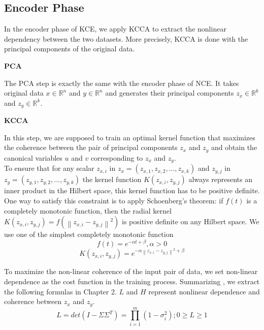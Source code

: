\documentclass[12pt]{report} %
\newcommand{\norm}[1]{\left\lVert #1 \right\rVert}
\begin{document}
\subsection{Encoder Phase}
In the encoder phase of KCE, we apply KCCA to extract the nonlinear dependency between the two datasets. More precisely, KCCA is done with the principal components of the original data.

\textbf{PCA}

The PCA step is exactly the same with the encoder phase of NCE. It takes original data $x\in \mathbb{R}^{n}$ and $y\in \mathbb{R}^{n}$ and generates their principal components $z_x\in \mathbb{R}^{k}$ and $z_y\in \mathbb{R}^{k}$.

\textbf{KCCA}

In this step, we are supposed to train an optimal kernel function that maximizes the coherence between the pair of principal components $z_x$ and $z_y$ and obtain the canonical variables $u$ and $v$ corresponding to $z_x$ and $z_y$. \\
To ensure that for any scalar \(z_{x,i}\) in \(z_x=(z_{x,1},z_{x,2},...,z_{x,k})\) and \(z_{y,j}\) in \(z_y=(z_{y,1},z_{y,2},...,z_{y,k})\) the kernel function $K(z_{x,i},z_{y,j})$ always represents an inner product in the Hilbert space, this kernel function has to be positive definite. One way to satisfy this constraint is to apply Schoenberg's theorem: if \(f(t)\) is a completely monotonic function, then the radial kernel $K(z_{x,i},z_{y,j})=f(\norm{z_{x,i}-z_{y,j}}^2)$ is positive definite on any Hilbert space. We use one of the simplest completely monotonic function
\begin{equation}
f(t)=e^{-\alpha t + \beta}, \alpha>0
\end{equation}
\begin{equation}
K(z_{x,i},z_{y,j})=e^{-\alpha \norm{z_{x,i}-z_{y,j}}^2 + \beta}
\end{equation}

To maximize the non-linear coherence of the input pair of data, we set non-linear dependence as the cost function in the training process. Summarizing \cite{ECCA}, we extract the following formulas in Chapter 2. $L$ and $H$ represent nonlinear dependence and coherence between $z_x$ and $z_y$.
\begin{equation}
L=det(I-\Sigma\Sigma^T)=\prod_{i=1}^{m}(1-\sigma_i^2);0 \geq L \geq 1
\end{equation}
\end{document}
